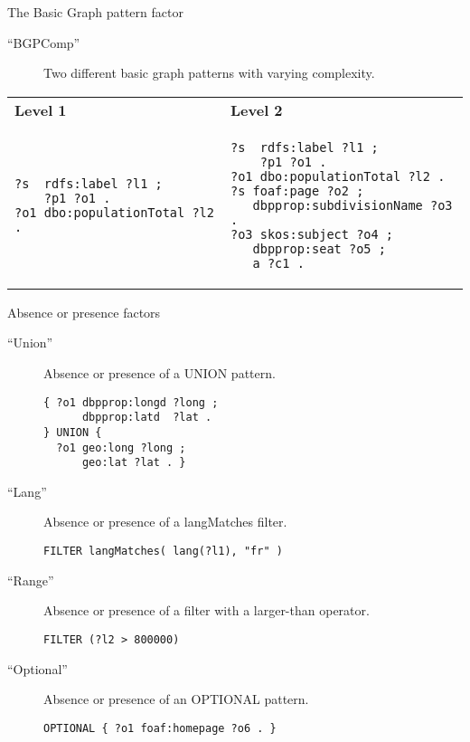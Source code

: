 \documentclass[english,usenames,dvipsnames,aspectratio=169]{beamer}
\begin{document}
\begin{frame}[fragile]{The Basic Graph pattern factor}
  \begin{description}

  \item [``BGPComp''] Two different basic graph patterns with varying
    complexity.
  \end{description}

  \begin{center}\small
    \begin{tabular}{|@{~~}p{}|@{~~}p{}|}
      \hline
      \textbf{Level 1} & \textbf{Level 2} \\[-2ex] 
      \begin{verbatim}
?s  rdfs:label ?l1 ;
    ?p1 ?o1 .
?o1 dbo:populationTotal ?l2 .
      \end{verbatim}
      & 
      \begin{verbatim}
?s  rdfs:label ?l1 ;
    ?p1 ?o1 .
?o1 dbo:populationTotal ?l2 .
?s foaf:page ?o2 ;
   dbpprop:subdivisionName ?o3 .
?o3 skos:subject ?o4 ;
   dbpprop:seat ?o5 ;
   a ?c1 .
\end{verbatim} 
\\      \hline
    \end{tabular}
  \end{center}

\end{frame}

\begin{frame}[fragile]{Absence or presence factors}
  \begin{description}
  \item [``Union''] Absence or presence of a \textsf{UNION} pattern.

    \begin{verbatim}
{ ?o1 dbpprop:longd ?long ;
      dbpprop:latd  ?lat .
} UNION {
  ?o1 geo:long ?long ;
      geo:lat ?lat . }
\end{verbatim} 

  \item [``Lang''] Absence or presence of a \textsf{langMatches}
    filter.

\begin{verbatim}
FILTER langMatches( lang(?l1), "fr" ) 
\end{verbatim} 


  \item [``Range''] Absence or presence of a filter with a larger-than
    operator.

    \begin{verbatim}
FILTER (?l2 > 800000)
\end{verbatim} 

  \item [``Optional''] Absence or presence of an \textsf{OPTIONAL}
    pattern.
    \begin{verbatim}
OPTIONAL { ?o1 foaf:homepage ?o6 . }
\end{verbatim} 

  \end{description}
\end{frame}
\end{document}

